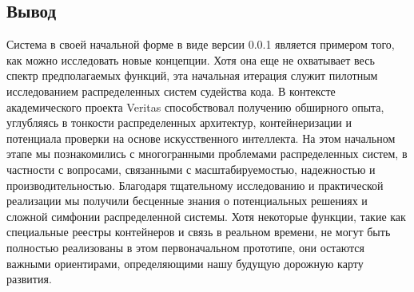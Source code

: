 \subsection{Вывод}
Система в своей начальной форме в виде версии 0.0.1 является примером того, как можно исследовать новые концепции. 
Хотя она еще не охватывает весь спектр предполагаемых функций, эта начальная итерация служит пилотным исследованием распределенных систем судейства кода.
В контексте академического проекта Veritas способствовал получению обширного опыта, углубляясь в тонкости распределенных архитектур, контейнеризации и потенциала проверки на основе искусственного интеллекта.
На этом начальном этапе мы познакомились с многогранными проблемами распределенных систем, в частности с вопросами, связанными с масштабируемостью, надежностью и производительностью.
Благодаря тщательному исследованию и практической реализации мы получили бесценные знания о потенциальных решениях и сложной симфонии распределенной системы.
Хотя некоторые функции, такие как специальные реестры контейнеров и связь в реальном времени, не могут быть полностью реализованы в этом первоначальном прототипе, они остаются важными ориентирами, определяющими нашу будущую дорожную карту развития.

